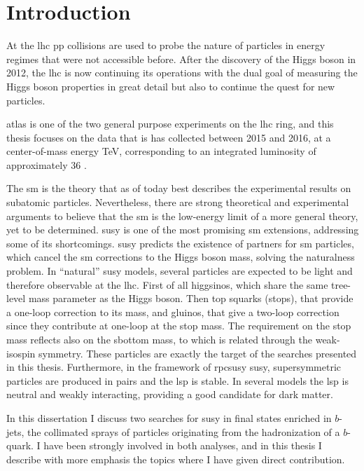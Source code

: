 \chapter*{Introduction}

At the \gls{lhc} \gls{pp} collisions are used to probe the nature of particles in energy regimes that were not accessible before. 
After the discovery of the Higgs boson in 2012, the \gls{lhc} is now continuing its operations with the dual goal 
of measuring the Higgs boson properties in great detail but also to continue the quest for new particles.

\gls{atlas} is one of the two general purpose experiments on the \gls{lhc} ring, and this thesis focuses on the data that is has collected between 
2015 and 2016, 
at a center-of-mass energy \cmtre TeV, corresponding to an 
integrated luminosity of approximately 36 \ifb. 

The \gls{sm} is the theory that as of today best describes the experimental results on subatomic particles. 
Nevertheless, there are strong theoretical and experimental arguments to believe that the \gls{sm} is the low-energy limit 
of a more general theory, yet to be determined. 
\gls{susy} is one of the most promising \gls{sm} extensions, 
addressing some of its shortcomings. \gls{susy} predicts the existence of partners for  
\gls{sm} particles, which cancel the \gls{sm} corrections to the Higgs boson mass, solving the naturalness problem. 
In ``natural'' \gls{susy} models, several particles are expected to be light and therefore observable at the \gls{lhc}.
First of all higgsinos, which share the same tree-level mass parameter as the Higgs boson. 
Then top squarks (stops), that provide a one-loop correction to its mass, and gluinos, that give a two-loop correction since they contribute 
at one-loop at the stop mass. 
The requirement on the stop mass reflects also on the sbottom mass, to which is related through the weak-isospin symmetry. 
These particles are exactly the target of the searches presented in this thesis.
Furthermore, in the framework of \gls{rpcsusy} \gls{susy}, supersymmetric particles are produced in pairs and the 
\gls{lsp} is stable. 
In several models the \gls{lsp} is neutral and weakly interacting, providing a good candidate for dark matter.
 

In this dissertation I discuss two searches for \gls{susy} in final states enriched in $b$-jets, the collimated sprays of 
particles originating from the hadronization of a $b$-quark. 
I have been strongly involved in both analyses, 
and in this thesis I describe with more emphasis the topics where I have given direct contribution.

